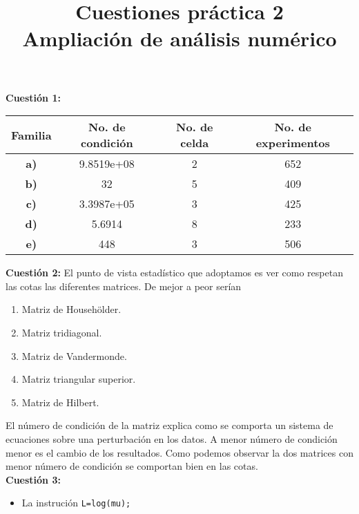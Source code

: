 \documentclass[12pt]{article}
\title{\textbf{Cuestiones práctica 2\\ {\small Ampliación de análisis numérico}}}
\date{}
\author{}
\theoremstyle{definition}
\begin{document}
\maketitle
	
\noindent\textbf{Cuestión 1:}
\begin{center}
	\begin{tabular}{|c || c | c  || c |}
		\hline
		\textbf{Familia} & \textbf{No. de condición} & \textbf{No. de celda} & \textbf{No. de experimentos} \\ 
		\hline
		\textbf{a)} & 9.8519e+08 & 2 & 652 \\
		\hline 
		\textbf{b)} & 32 & 5 & 409\\
		\hline
		\textbf{c)} & 3.3987e+05 & 3 & 425\\
		\hline 
		\textbf{d)} & 5.6914 & 8 & 233\\
		\hline
		\textbf{e)} & 448 & 3 & 506 \\
		\hline
	\end{tabular}
\end{center}
\noindent\textbf{Cuestión 2:}
El punto de vista estadístico que adoptamos es ver como respetan las cotas las diferentes matrices. De mejor a peor serían
\begin{enumerate}
	\item Matriz de Househölder.
	\item Matriz tridiagonal.
	\item Matriz de Vandermonde.
	\item Matriz triangular superior.
	\item Matriz de Hilbert.
\end{enumerate}
El número de condición de la matriz explica como se comporta un sistema de ecuaciones sobre una perturbación en los datos. A menor número de condición menor es el cambio de los resultados. Como podemos observar la dos matrices con menor número de condición se comportan bien en las cotas. \\ 
\noindent\textbf{Cuestión 3:} 
\begin{itemize}
	\item La instrución \texttt{L=log(mu);}
\end{itemize}
\end{document}
